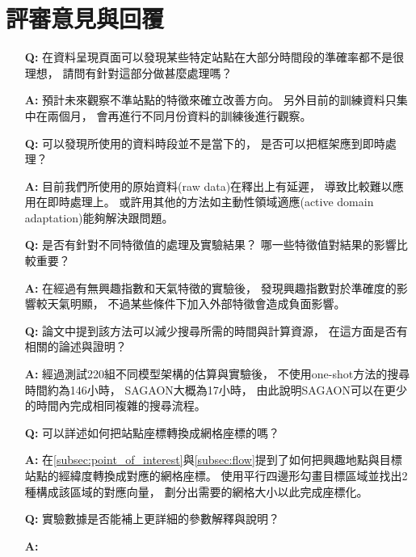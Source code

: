 \documentclass[a4paper,14pt]{extarticle}
\begin{document}
    \section{評審意見與回覆}
        \begin{itemize}
            \item [\textbf{Q:}]
            在資料呈現頁面可以發現某些特定站點在大部分時間段的準確率都不是很理想，
            請問有針對這部分做甚麼處理嗎？
            \item [\textbf{A:}]
            預計未來觀察不準站點的特徵來確立改善方向。
            另外目前的訓練資料只集中在兩個月，
            會再進行不同月份資料的訓練後進行觀察。
            \item [\textbf{Q:}]
            可以發現所使用的資料時段並不是當下的，
            是否可以把框架應到即時處理？
            \item [\textbf{A:}]
            目前我們所使用的原始資料(raw data)在釋出上有延遲，
            導致比較難以應用在即時處理上。
            或許用其他的方法如主動性領域適應(active domain adaptation)能夠解決跟問題。
            \item [\textbf{Q:}]
            是否有針對不同特徵值的處理及實驗結果？
            哪一些特徵值對結果的影響比較重要？
            \item [\textbf{A:}]
            在經過有無興趣指數和天氣特徵的實驗後，
            發現興趣指數對於準確度的影響較天氣明顯，
            不過某些條件下加入外部特徵會造成負面影響。
            \item [\textbf{Q:}]
            論文中提到該方法可以減少搜尋所需的時間與計算資源，
            在這方面是否有相關的論述與證明？
            \item [\textbf{A:}]
            經過測試220組不同模型架構的估算與實驗後，
            不使用one-shot方法的搜尋時間約為146小時，
            SAGAON大概為17小時，
            由此說明SAGAON可以在更少的時間內完成相同複雜的搜尋流程。
            \item [\textbf{Q:}]
            可以詳述如何把站點座標轉換成網格座標的嗎？
            \item [\textbf{A:}]
            在\ref{subsec:point_of_interest}與\ref{subsec:flow}提到了如何把興趣地點與目標站點的經緯度轉換成對應的網格座標。
            使用平行四邊形勾畫目標區域並找出2種構成該區域的對應向量，
            劃分出需要的網格大小以此完成座標化。
            \item [\textbf{Q:}]
            實驗數據是否能補上更詳細的參數解釋與說明？
            \item [\textbf{A:}]

\end{itemize}
\end{document}
